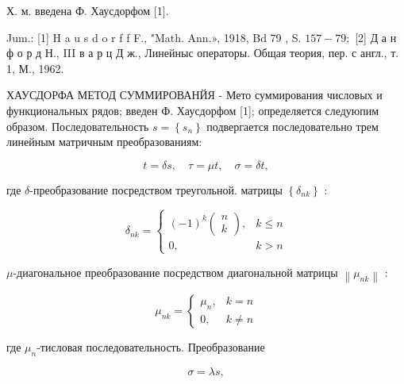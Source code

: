 \documentclass[10pt]{article}
\begin{document}
Х. м. введена Ф. Хаусдорфом [1].



Jum.: [1] H a u s d o r f f F., "Math. Ann.», 1918, Bd 79 , S. $157-79 ;$ [2] Д а н ф о р д Н., III в а р ц Д ж., Линейныс операторы. Общая теория, пер. с англ., т. 1, М., 1962.



ХАУСДОРФА МЕТОД СУММИРОВАНЙЯ - Мето суммирования числовых и функциональных рядов; введен Ф. Хаусдорфом [1]; определяется следуюпим образом. Последовательность $s=\left\{s_{n}\right\}$ подвергается последовательно трем линейным матричным преобразованиям:



\[

t=\delta s, \quad \tau=\mu t, \quad \sigma=\delta t,

\]



где $\delta$-преобразование посредством треугольной. матрицы $\left\{\delta_{n k}\right\}$ :



\[

\delta_{n k}= \begin{cases}(-1)^{k}\left(\begin{array}{c}

n \\

k

\end{array}\right), & k \leqslant n \\

0, & k>n\end{cases}

\]



$\mu$-диагональное преобразование посредством диагональной матрицы $\left\|\mu_{n k}\right\|$ :



\[

\mu_{n k}= \begin{cases}\mu_{n}, & k=n \\ 0, & k \neq n\end{cases}

\]



где $\mu_{n}$-тисловая последовательность. Преобразование



\[

\sigma=\lambda s,

\]
\end{document}
